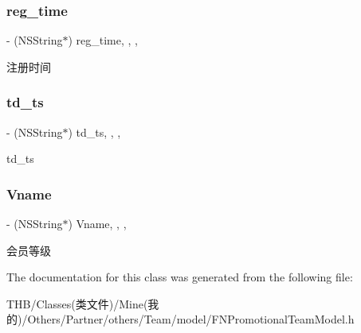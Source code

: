 \subsubsection{\texorpdfstring{reg\+\_\+time}{reg\_time}}
{\footnotesize\ttfamily -\/ (N\+S\+String$\ast$) reg\+\_\+time\hspace{0.3cm}{\ttfamily [read]}, {\ttfamily [write]}, {\ttfamily [nonatomic]}, {\ttfamily [copy]}}

注册时间 \mbox{\label{interface_p_t_mfan_ab5654478302146e3197db3b4ba481a76}} 
\subsubsection{\texorpdfstring{td\+\_\+ts}{td\_ts}}
{\footnotesize\ttfamily -\/ (N\+S\+String$\ast$) td\+\_\+ts\hspace{0.3cm}{\ttfamily [read]}, {\ttfamily [write]}, {\ttfamily [nonatomic]}, {\ttfamily [copy]}}

td\+\_\+ts \mbox{\label{interface_p_t_mfan_a08fb619d87a8e571c673ca0c30a9a94f}} 
\subsubsection{\texorpdfstring{Vname}{Vname}}
{\footnotesize\ttfamily -\/ (N\+S\+String$\ast$) Vname\hspace{0.3cm}{\ttfamily [read]}, {\ttfamily [write]}, {\ttfamily [nonatomic]}, {\ttfamily [copy]}}

会员等级 

The documentation for this class was generated from the following file\+:\begin{DoxyCompactItemize}
\item 
T\+H\+B/\+Classes(类文件)/\+Mine(我的)/\+Others/\+Partner/others/\+Team/model/F\+N\+Promotional\+Team\+Model.\+h\end{DoxyCompactItemize}
